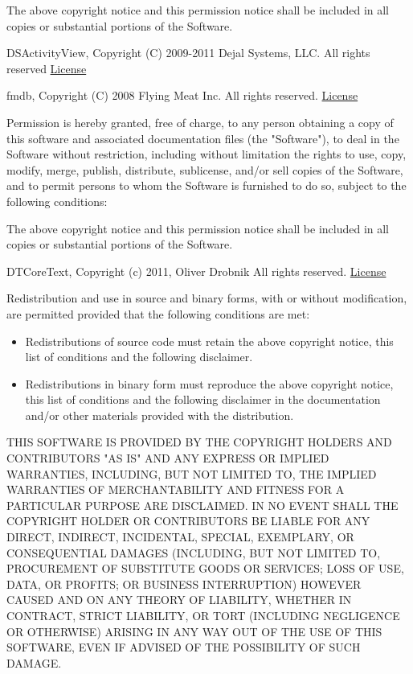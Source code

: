 \documentclass{tufte-book}
\newcommand{\licensetext}{\scriptsize \setlength{\parskip}{0mm} \singlespacing}
\begin{document}
\begin{fullwidth}
{The above copyright notice and this permission notice shall be included in all copies or substantial portions of the Software.}

DSActivityView, Copyright (C) 2009-2011 Dejal Systems, LLC. All rights reserved \href{https://dejal.svn.beanstalkapp.com/open/DSActivityView/Sources/DSActivityView.h}{License}

fmdb, Copyright (C) 2008 Flying Meat Inc. All rights reserved. \href{https://raw.github.com/ccgus/fmdb/master/LICENSE.txt}{License}

{\licensetext Permission is hereby granted, free of charge, to any person obtaining a copy
of this software and associated documentation files (the "Software"), to deal
in the Software without restriction, including without limitation the rights
to use, copy, modify, merge, publish, distribute, sublicense, and/or sell
copies of the Software, and to permit persons to whom the Software is
furnished to do so, subject to the following conditions:

The above copyright notice and this permission notice shall be included in
all copies or substantial portions of the Software.}

DTCoreText, Copyright (c) 2011, Oliver Drobnik All rights reserved. \href{https://raw.github.com/Cocoanetics/DTCoreText/master/LICENSE}{License}

{\licensetext Redistribution and use in source and binary forms, with or without
modification, are permitted provided that the following conditions are met:

\begin{itemize}
\item Redistributions of source code must retain the above copyright notice, this
list of conditions and the following disclaimer. 

\item Redistributions in binary form must reproduce the above copyright notice,
this list of conditions and the following disclaimer in the documentation
and/or other materials provided with the distribution.
\end{itemize}

THIS SOFTWARE IS PROVIDED BY THE COPYRIGHT HOLDERS AND CONTRIBUTORS "AS IS"
AND ANY EXPRESS OR IMPLIED WARRANTIES, INCLUDING, BUT NOT LIMITED TO, THE
IMPLIED WARRANTIES OF MERCHANTABILITY AND FITNESS FOR A PARTICULAR PURPOSE ARE
DISCLAIMED. IN NO EVENT SHALL THE COPYRIGHT HOLDER OR CONTRIBUTORS BE LIABLE
FOR ANY DIRECT, INDIRECT, INCIDENTAL, SPECIAL, EXEMPLARY, OR CONSEQUENTIAL
DAMAGES (INCLUDING, BUT NOT LIMITED TO, PROCUREMENT OF SUBSTITUTE GOODS OR
SERVICES; LOSS OF USE, DATA, OR PROFITS; OR BUSINESS INTERRUPTION) HOWEVER
CAUSED AND ON ANY THEORY OF LIABILITY, WHETHER IN CONTRACT, STRICT LIABILITY,
OR TORT (INCLUDING NEGLIGENCE OR OTHERWISE) ARISING IN ANY WAY OUT OF THE USE
OF THIS SOFTWARE, EVEN IF ADVISED OF THE POSSIBILITY OF SUCH DAMAGE.}


\end{fullwidth}
\end{document}
